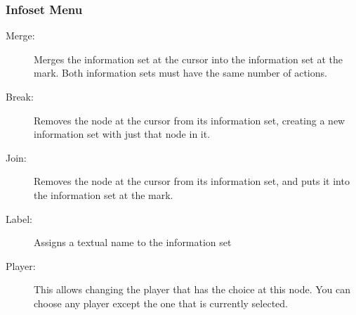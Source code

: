 \subsubsection{Infoset Menu}
\begin{description}
\item[Merge:] Merges the information set at the cursor into the information set at 
the mark.  Both information sets must have the same number of actions.  
\item[Break:] Removes the node at the cursor from its information set, creating a new 
information set with just that node in it. 
\item[Join:] Removes the node at the cursor from its information set, and puts it into 
the information set at the mark.  
\item[Label:] Assigns a textual name to the information set
\item[Player:]  This allows changing the player that has the choice
at this node.  You can choose any player except the one that is currently
selected.
\end{description}

